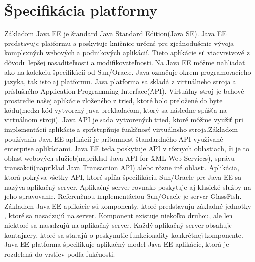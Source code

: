 \section{Špecifikácia platformy}
Základom Java EE je štandard Java Standard Edition(Java SE). Java EE predstavuje platformu a poskytuje knižnice určené pre zjednodušenie vývoja komplexných webových a podnikových aplikácií\cite{fitweb}. Tieto aplikácie sú viacvrstvové z dôvodu lepšej nasaditeľnosti a modifikovateľnosti. Na Java EE môžme nahliadať ako na kolekciu špecifikácií od Sun/Oracle. Java označuje okrem programovacieho jazyka, tak isto aj platformu. Java platforma sa skladá z virtuálneho stroja a príslušného Application Programming Interface(API). Virtuálny stroj je behové prostredie našej aplikácie zloženého z tried, ktoré bolo preložené do byte kódu(medzi kód vytvorený java prekladačom, ktorý sa následne spúšťa na virtuálnom stroji). Java API je sada vytvorených tried, ktoré môžme využiť pri implementácií aplikácie a sprístupňuje funkčnosť virtuálneho stroja\cite{javaeespec}.\newline \indent Základom používania Java EE aplikácií je prítomnosť štandardného API využívané enterprise aplikáciami. Java EE teda poskytuje API v rôznych oblastiach, či je to oblasť webových služieb(napríklad Java API for XML Web Services), správu transakcií(napríklad Java Transaction API) alebo rôzne iné oblasti. Aplikácia, ktorá pokrýva všetky API, ktoré spĺňa špecifikáciu Sun/Oracle pre Java EE sa nazýva aplikačný server. Aplikačný server rovnako poskytuje aj klasické služby na jeho spravovanie. Referenčnou implementáciou Sun/Oracle je server GlassFish. Základom Java EE aplikácie sú komponenty, ktoré predstavuju základné jednotky , ktoré sa nasadzujú na server. Komponent existuje niekoľko druhou, ale len niektoré sa nasadzujú na aplikačný server. Každý aplikačný server obsahuje kontajnery, ktoré sa starajú o poskynutie funkcionality konkrétnej komponente. Java EE platforma špecifikuje aplikačný model Java EE aplikácie, ktorá je rozdelená do vrstiev podľa fukčnosti.

